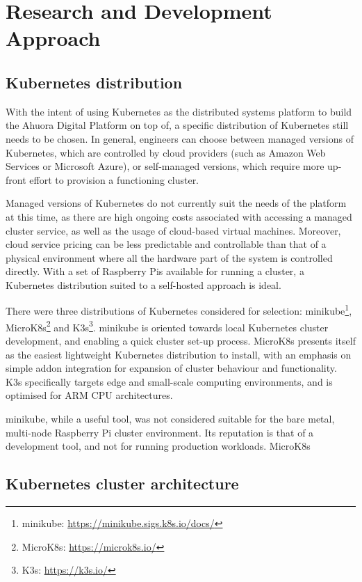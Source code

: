 \chapter{Research and Development Approach}

\section{Kubernetes distribution}

With the intent of using Kubernetes as the distributed systems platform to build the Ahuora Digital Platform on top of, a specific distribution of Kubernetes still needs to be chosen. In general, engineers can choose between managed versions of Kubernetes, which are controlled by cloud providers (such as Amazon Web Services or Microsoft Azure), or self-managed versions, which require more up-front effort to provision a functioning cluster.

Managed versions of Kubernetes do not currently suit the needs of the platform at this time, as there are high ongoing costs associated with accessing a managed cluster service, as well as the usage of cloud-based virtual machines. Moreover, cloud service pricing can be less predictable and controllable than that of a physical environment where all the hardware part of the system is controlled directly. With a set of Raspberry Pis available for running a cluster, a Kubernetes distribution suited to a self-hosted approach is ideal.

There were three distributions of Kubernetes considered for selection: minikube\footnote{minikube: \url{https://minikube.sigs.k8s.io/docs/}}, MicroK8s\footnote{MicroK8s: \url{https://microk8s.io/}} and K3s\footnote{K3s: \url{https://k3s.io/}}. minikube is oriented towards local Kubernetes cluster development, and enabling a quick cluster set-up process. MicroK8s presents itself as the easiest lightweight Kubernetes distribution to install, with an emphasis on simple addon integration for expansion of cluster behaviour and functionality. K3s specifically targets edge and small-scale computing environments, and is optimised for ARM CPU architectures.

minikube, while a useful tool, was not considered suitable for the bare metal, multi-node Raspberry Pi cluster environment. Its reputation is that of a development tool, and not for running production workloads. MicroK8s 

\section{Kubernetes cluster architecture}

